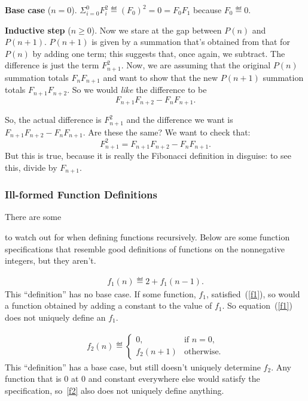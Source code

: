 \begin{definition}
\textbf{Base case} ($n=0$). 
$\Sigma_{i=0}^0 F_i^2 \eqdef (F_0)^2 = 0 = F_0 F_1$ because
$F_0 \eqdef 0$.

\textbf{Inductive step} ($n\geq 0$).  Now we stare at the gap between
$P(n)$ and $P(n+1)$.  $P(n+1)$ is given by a summation that's obtained
from that for $P(n)$ by adding one term; this suggests that, once again,
we subtract.  The difference is just the term $F_{n+1}^2$.  Now, we are
assuming that the original $P(n)$ summation totals $F_n F_{n+1}$ and want
to show that the new $P(n+1)$ summation totals $F_{n+1} F_{n+2}$.  So we
would {\em like\/} the difference to be
\[
F_{n+1} F_{n+2} - F_n F_{n+1}.
\]

So, the actual difference is $F_{n+1}^2$ and the difference we want is
$F_{n+1} F_{n+2} - F_n F_{n+1}$.  Are these the same?  We want to check
that:
\[
F_{n+1}^2 = F_{n+1} F_{n+2} - F_n F_{n+1}.
\]
But this is true, because it is really the Fibonacci definition in
disguise: to see this, divide by $F_{n+1}$.
\fi




\subsubsection{Ill-formed Function Definitions}

There are some  to watch out for when
defining functions recursively.  Below are some function specifications
that resemble good definitions of functions on the nonnegative integers,
but they aren't.

\begin{eqnarray}\label{f1}
f_1(n)\eqdef 2+f_1(n-1).
\end{eqnarray}
This ``definition'' has no base case.  If some function, $f_1$,
satisfied~(\ref{f1}), so would a function obtained by adding a constant to
the value of $f_1$.  So equation~(\ref{f1}) does not uniquely define
an $f_1$.

\begin{eqnarray}\label{f2}
f_2(n) \eqdef
\begin{cases}
 0, & \text{if $n=0$},\\
 f_2(n+1) &  \text{otherwise}.
\end{cases}
\end{eqnarray}
This ``definition'' has a base case, but still doesn't uniquely determine
$f_2$.  Any function that is 0 at 0 and constant everywhere else would
satisfy the specification, so~\eqref{f2} also does not uniquely define
anything.


\end{definition}
